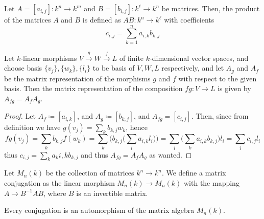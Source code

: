 \begin{definition}\label{def: matrix multiplication}
    Let \(A = [a_{i,j}] : k^n \to k^m\) and \(B = [b_{i, j}] : k^\ell \to k^n\) be
    matrices. Then, the product of the matrices \(A\) and \(B\) is defined as
    \(AB : k^n \to k^\ell\) with coefficients
    \[
        c_{i, j} = \sum_{k=1}^n a_{i, k} b_{k, j}
    \]
\end{definition}

\begin{proposition}
    \label{prop: matrix of the composition}
    Let \(k\)-linear morphisms \(V \xrightarrow g W \xrightarrow f L\) of finite
    \(k\)-dimensional vector spaces, and choose basis \(\{v_j\}, \{w_k\}, \{l_i\}\)
    to be basis of \(V, W, L\) respectively, and let \(A_g\) and \(A_f\) be the
    matrix representation of the morphisms \(g\) and \(f\) with respect to the
    given basis. Then the matrix representation of the composition \(f  g: V
    \to L\) is given by \(A_{f  g} = A_f A_g\).
\end{proposition}

\begin{proof}
    Let \(A_f \coloneq [a_{i, k}]\), and \(A_g \coloneq [b_{k, j}]\), and \(A_{f  g} =
    [c_{i, j}]\). Then, since from definition we have \(g(v_j) = \sum_k b_{k, j}
    w_k\), hence
    \[
        f  g(v_j) =
        \sum_k b_{k, j} f(w_k) =
        \sum_k \bigg( b_{k, j} \bigg( \sum_i a_{i, k} l_i \bigg) \bigg)
        = \sum_i \bigg( \sum_k a_{i, k} b_{k, j} \bigg) l_i
        = \sum_i c_{i, j} l_i
    \]
    thus \(c_{i, j} = \sum_k a_k{i, k} b_{k, j}\) and thus \(A_{f  g} = A_f
    A_g\) as wanted.
\end{proof}

\begin{definition}[Conjugation]\label{def: matrix conjugation}
    Let \(M_n(k)\) be the collection of matrices \(k^n \to k^n\). We define a
    matrix conjugation as the linear morphism \(M_n(k) \to M_n(k)\) with the
    mapping \(A \mapsto B^{-1} A B\), where \(B\) is an invertible matrix.
\end{definition}

\begin{proposition}
    Every conjugation is an automorphism of the matrix algebra \(M_n(k)\).
\end{proposition}
